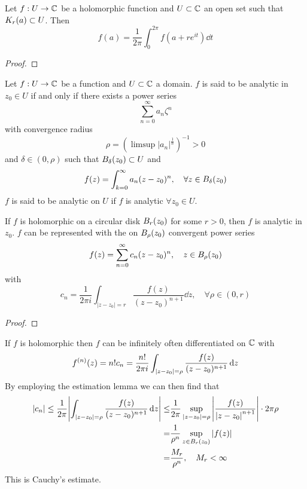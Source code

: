 \documentclass[../../script.tex]{subfiles}
\begin{document}
\begin{cor}
    Let $f: U \rightarrow \cmpln$ be a holomorphic function and $U \subset \cmpln$ an open set such that $\cball[r](a) \subset U$. Then 
    \[
        f(a) = \frac{1}{2\pi} \int_0^{2\pi} f(a + re^{it}) \dd{t}
    \]
\end{cor}
\begin{proof}
    \reader
\end{proof}

\begin{defi}
    Let $f: U \rightarrow \cmpln$ be a function and $U \subset \cmpln$ a domain. $f$ is said to be analytic in $z_0 \in U$ if and only if there exists a power series
    \[
        \sum_{n=0}^{\infty} a_n \zeta^n
    \]
    with convergence radius 
    \[
        \rho = \left(\limsup |a_n|^{\frac{1}{n}}\right)^{-1} > 0
    \]
    and $\delta \in (0, \rho)$ such that $\oball[\delta](z_0) \subset U$ and
    \[
        f(z) = \int_{k=0}^{\infty} a_n (z - z_0)^n, \quad \forall z \in \oball[\delta](z_0)
    \]
    $f$ is said to be analytic on $U$ if $f$ is analytic $\forall z_0 \in U$.
\end{defi}

\begin{thm}
    If $f$ is holomorphic on a circular disk $\oball[r](z_0)$ for some $r > 0$, then $f$ is analytic in $z_0$.
    $f$ can be represented with the on $\oball[\rho](z_0)$ convergent power series 
    \[
        f(z) = \sum_{n=0}^{\infty} c_n (z - z_0)^n, \quad z \in \oball[\rho](z_0)
    \]
    with 
    \[
        c_n = \frac{1}{2\pi i} \int_{|z - z_0| = r} \frac{f(z)}{(z - z_0)^{n+1}} \dd{z}, \quad \forall \rho \in (0, r)
    \]
\end{thm}
\begin{proof}
    \noproof
\end{proof}

\begin{rem}
    If $f$ is holomorphic then $f$ can be infinitely often differentiated on $\cmpln$ with 
    \[
        f^{(n)}(z) = n! c_n = \frac{n!}{2\pi i} \int_{\abs{z - z_0} = \rho} \frac{f(z)}{(z- z_0)^{n+1}} \dd{z}
    \]
    By employing the estimation lemma we can then find that 
    \begin{align*}
        \abs{c_n} \le \frac{1}{2\pi} \abs{\int_{\abs{z - z_0} = \rho} \frac{f(z)}{(z - z_0)^{n+1}} \dd{z}} \le &\frac{1}{2\pi} \sup_{\abs{z - z_0} = \rho} \abs{\frac{f(z)}{\abs{z - z_0}^{n+1}}} \cdot 2\pi \rho \\
        = &\frac{1}{\rho^n} \sup_{z \in \oball[r](z_0)} \abs{f(z)} \\
        = &\frac{M_r}{\rho^n}, \quad M_r < \infty
    \end{align*}
    This is Cauchy's estimate.
\end{rem}
\end{document}
